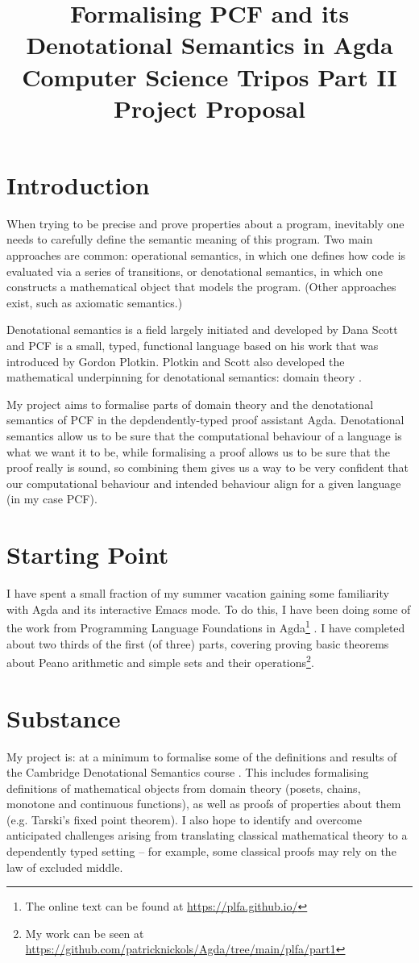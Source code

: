 \documentclass{article}
\begin{document}
\title{Formalising PCF and its Denotational Semantics in Agda \\
\large Computer Science Tripos Part II Project Proposal}
\section{Introduction}
When trying to be precise and prove properties about a program, inevitably one needs to carefully define the semantic meaning of this program. Two main approaches are common: operational semantics, in which one defines how code is evaluated via a series of transitions, or denotational semantics, in which one constructs a mathematical object that models the program. (Other approaches exist, such as axiomatic semantics.)

Denotational semantics \cite{SemDomsAndDenSem} is a field largely initiated and developed by Dana Scott and PCF is a small, typed, functional language based on his work that was introduced by Gordon Plotkin. Plotkin and Scott also developed the mathematical underpinning for denotational semantics: domain theory \cite{DomainTheory}. 

My project aims to formalise parts of domain theory and the denotational semantics of PCF in the depdendently-typed proof assistant Agda. Denotational semantics allow us to be sure that the computational behaviour of a language is what we want it to be, while formalising a proof allows us to be sure that the proof really is sound, so combining them gives us a way to be very confident that our computational behaviour and intended behaviour align for a given language (in my case PCF). 

\section{Starting Point}
I have spent a small fraction of my summer vacation gaining some familiarity with Agda and its interactive Emacs mode. To do this, I have been doing some of the work from Programming Language Foundations in Agda\footnote{The online text can be found at \url{https://plfa.github.io/}} \cite{PLFA}. I have completed about two thirds of the first (of three) parts, covering proving basic theorems about Peano arithmetic and simple sets and their operations\footnote{My work can be seen at \url{https://github.com/patricknickols/Agda/tree/main/plfa/part1}}.  

\section{Substance}
My project is: at a minimum to formalise some of the definitions and results of the Cambridge Denotational Semantics course \cite{DenSem_lecture_notes}. This includes formalising definitions of mathematical objects from domain theory (posets, chains, monotone and continuous functions), as well as proofs of properties about them (e.g. Tarski's fixed point theorem). I also hope to identify and overcome anticipated challenges arising from translating classical mathematical theory to a dependently typed setting -- for example, some classical proofs may rely on the law of excluded middle.
\end{document}

